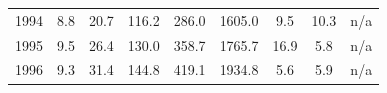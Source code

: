 \documentclass[openany]{book}
\begin{document}
\begin{table}[htbp]
{\begin{tabular}{ccccccccc}
\rowcolor[HTML]{F8F9FA} 
{\color[HTML]{202122} 1994}        & {\color[HTML]{202122} 8.8}                                                                  & {\color[HTML]{202122} 20.7}                                                                         & {\color[HTML]{202122} 116.2}                                                                    & {\color[HTML]{202122} 286.0}                                                                               & {\color[HTML]{202122} 1605.0}                                                                          & {\color[HTML]{202122} 9.5}                                                                            & {\color[HTML]{202122} 10.3}                                                                              & {\color[HTML]{202122} n/a}                                                                               \\
\rowcolor[HTML]{F8F9FA} 
{\color[HTML]{202122} 1995}        & {\color[HTML]{202122} 9.5}                                                                  & {\color[HTML]{202122} 26.4}                                                                         & {\color[HTML]{202122} 130.0}                                                                    & {\color[HTML]{202122} 358.7}                                                                               & {\color[HTML]{202122} 1765.7}                                                                          & {\color[HTML]{202122} 16.9}                                                                           & {\color[HTML]{202122} 5.8}                                                                               & {\color[HTML]{202122} n/a}                                                                               \\
\rowcolor[HTML]{F8F9FA} 
{\color[HTML]{202122} 1996}        & {\color[HTML]{202122} 9.3}                                                                  & {\color[HTML]{202122} 31.4}                                                                         & {\color[HTML]{202122} 144.8}                                                                    & {\color[HTML]{202122} 419.1}                                                                               & {\color[HTML]{202122} 1934.8}                                                                          & {\color[HTML]{202122} 5.6}                                                                            & {\color[HTML]{202122} 5.9}                                                                               & {\color[HTML]{202122} n/a}                                                                               \\

\end{tabular}}
\end{table}
\end{document}

